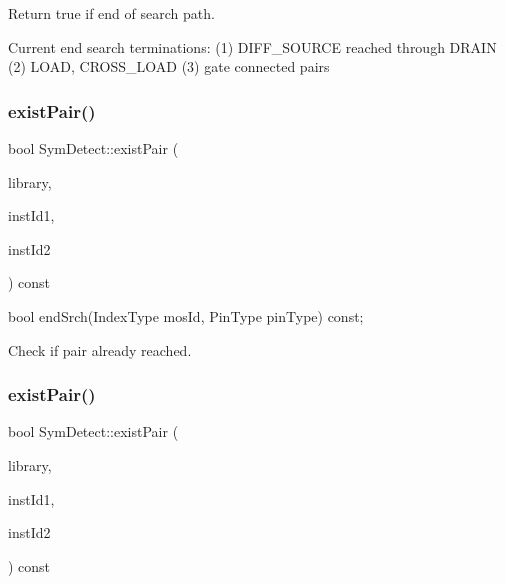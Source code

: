 Return true if end of search path. 

Current end search terminations\+: (1) D\+I\+F\+F\+\_\+\+S\+O\+U\+R\+CE reached through D\+R\+A\+IN (2) L\+O\+AD, C\+R\+O\+S\+S\+\_\+\+L\+O\+AD (3) gate connected pairs \mbox{\label{classSymDetect_a245b48760c705d4ad9b2bad39012030e}} 
\subsubsection{\texorpdfstring{exist\+Pair()}{existPair()}\hspace{0.1cm}{\footnotesize\ttfamily [1/2]}}
{\footnotesize\ttfamily bool Sym\+Detect\+::exist\+Pair (\begin{DoxyParamCaption}\item[{std\+::vector$<$ \hyperlink{structMosPair}{Mos\+Pair} $>$ \&}]{library,  }\item[{\hyperlink{type_8h_a581e8093e28e7362f2b6937296190676}{Index\+Type}}]{inst\+Id1,  }\item[{\hyperlink{type_8h_a581e8093e28e7362f2b6937296190676}{Index\+Type}}]{inst\+Id2 }\end{DoxyParamCaption}) const\hspace{0.3cm}{\ttfamily [private]}}



bool end\+Srch(\+Index\+Type mos\+Id, Pin\+Type pin\+Type) const; 

Check if pair already reached. \mbox{\label{classSymDetect_a821c77fb04532c8fb6a6f2f26c51bebf}} 
\subsubsection{\texorpdfstring{exist\+Pair()}{existPair()}\hspace{0.1cm}{\footnotesize\ttfamily [2/2]}}
{\footnotesize\ttfamily bool Sym\+Detect\+::exist\+Pair (\begin{DoxyParamCaption}\item[{std\+::vector$<$ \hyperlink{structSymDetect_1_1srchObj}{srch\+Obj} $>$ \&}]{library,  }\item[{\hyperlink{type_8h_a581e8093e28e7362f2b6937296190676}{Index\+Type}}]{inst\+Id1,  }\item[{\hyperlink{type_8h_a581e8093e28e7362f2b6937296190676}{Index\+Type}}]{inst\+Id2 }\end{DoxyParamCaption}) const\hspace{0.3cm}{\ttfamily [private]}}



